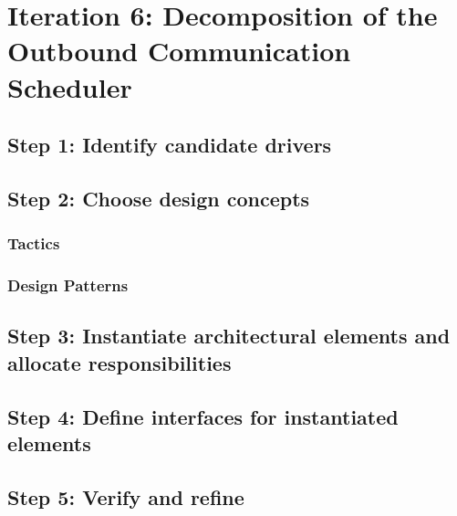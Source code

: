 \section{Iteration 6: Decomposition of the Outbound Communication Scheduler}
\label{add:it6}

\subsection{Step 1: Identify candidate drivers}
\label{add:it6/drivers}

\subsection{Step 2: Choose design concepts}
\label{add:it6/concepts}

\subsubsection{Tactics}
\label{add:it6/tactics}

\subsubsection{Design Patterns}
\label{add:it6/patterns}

\subsection{Step 3: Instantiate architectural elements and allocate responsibilities}
\label{add:it6/elements}

\subsection{Step 4: Define interfaces for instantiated elements}
\label{add:it6/interfaces}

\subsection{Step 5: Verify and refine}
\label{add:it6/verification}